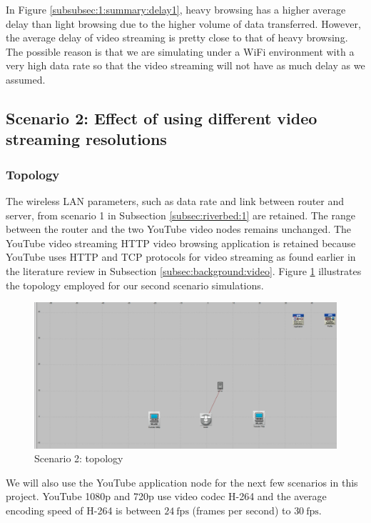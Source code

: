 In Figure \ref{subsubsec:1:summary:delay1}, heavy browsing has a higher average delay than light browsing due to the higher volume of data transferred. However, the average delay of video streaming is pretty close to that of heavy browsing. The possible reason  is that we are simulating under a \gls{WiFi} environment with a very high data rate so that the video streaming will not have as much delay as we assumed.

\subsection{Scenario 2: Effect of using different video streaming resolutions} \label{subsec:riverbed:2}
\subsubsection{Topology} \label{subsubsec:2:topo}
The wireless LAN parameters, such as data rate and link between router and server, from scenario 1 in Subsection \ref{subsec:riverbed:1} are retained. The range between the router and the two YouTube video nodes remains unchanged. The YouTube video streaming \gls{HTTP} video browsing application is retained because YouTube uses \gls{HTTP} and \gls{TCP} protocols for video streaming as found earlier in the literature review in Subsection \ref{subsec:background:video}. Figure \ref{fig:2:topo} illustrates the topology employed for our second scenario simulations.

\begin{figure}[H]
	\centering
	\includegraphics[scale=0.3]{Figures/amantianrenamed/Scenario2Topology.png}
	\caption{Scenario 2: topology}
	\label{fig:2:topo}
\end{figure}

We will also use the YouTube application node for the next few scenarios in this project. YouTube 1080p and 720p use video codec H-264 and the average encoding speed of H-264 is between $24~\mathrm{fps}$ (frames per second) to $30~\mathrm{fps}$.

